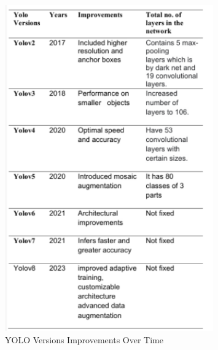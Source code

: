 \begin{figure}[h!]
    \centering
    \includegraphics[width=0.8\textwidth]{images/YOLOv1 to YOLOv8.png}
    \caption{YOLO Versions Improvements Over Time}
\end{figure}\\\\
%
